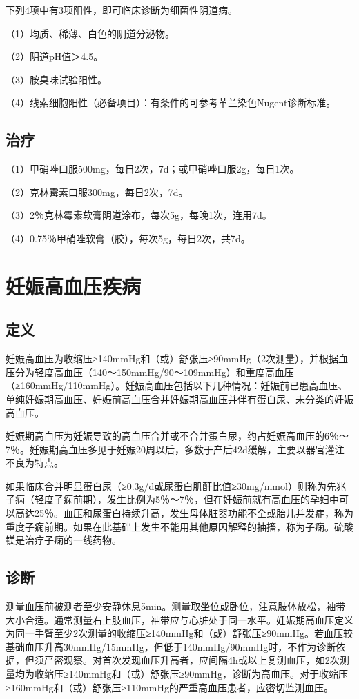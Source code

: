 下列4项中有3项阳性，即可临床诊断为细菌性阴道病。

（1）均质、稀薄、白色的阴道分泌物。

（2）阴道pH值＞4.5。

（3）胺臭味试验阳性。

（4）线索细胞阳性（必备项目）：有条件的可参考革兰染色Nugent诊断标准。

\subsection{治疗}

（1）甲硝唑口服500mg，每日2次，7d；或甲硝唑口服2g，每日1次。

（2）克林霉素口服300mg，每日2次，7d。

（3）2％克林霉素软膏阴道涂布，每次5g，每晚1次，连用7d。

（4）0.75％甲硝唑软膏（胶），每次5g，每日2次，共7d。

\section{妊娠高血压疾病}

\subsection{定义}

妊娠高血压为收缩压≥140mmHg和（或）舒张压≥90mmHg（2次测量），并根据血压分为轻度高血压（140～150mmHg/90～109mmHg）和重度高血压（≥160mmHg/110mmHg）。妊娠高血压包括以下几种情况：妊娠前已患高血压、单纯妊娠期高血压、妊娠前高血压合并妊娠期高血压并伴有蛋白尿、未分类的妊娠高血压。

妊娠期高血压为妊娠导致的高血压合并或不合并蛋白尿，约占妊娠高血压的6％～7％。妊娠期高血压多见于妊娠20周以后，多数于产后42d缓解，主要以器官灌注不良为特点。

如果临床合并明显蛋白尿（≥0.3g/d或尿蛋白肌酐比值≥30mg/mmol）则称为先兆子痫（轻度子痫前期），发生比例为5％～7％，但在妊娠前就有高血压的孕妇中可以高达25％。血压和尿蛋白持续升高，发生母体脏器功能不全或胎儿并发症，称为重度子痫前期。如果在此基础上发生不能用其他原因解释的抽搐，称为子痫。硫酸镁是治疗子痫的一线药物。

\subsection{诊断}

测量血压前被测者至少安静休息5min。测量取坐位或卧位，注意肢体放松，袖带大小合适。通常测量右上肢血压，袖带应与心脏处于同一水平。妊娠期高血压定义为同一手臂至少2次测量的收缩压≥140mmHg和（或）舒张压≥90mmHg。若血压较基础血压升高30mmHg/15mmHg，但低于140mmHg/90mmHg时，不作为诊断依据，但须严密观察。对首次发现血压升高者，应间隔4h或以上复测血压，如2次测量均为收缩压≥140mmHg和（或）舒张压≥90mmHg，诊断为高血压。对于收缩压≥160mmHg和（或）舒张压≥110mmHg的严重高血压患者，应密切监测血压。

